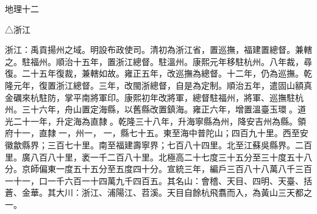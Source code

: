 
\begin{pinyinscope}
地理十二

△浙江

浙江：禹貢揚州之域。明設布政使司。清初為浙江省，置巡撫，福建置總督。兼轄之。駐福州。順治十五年，置浙江總督。駐溫州。康熙元年移駐杭州。八年裁，尋復。二十五年復裁，兼轄如故。雍正五年，改巡撫為總督。十二年，仍為巡撫。乾隆元年，復置浙江總督。三年，改閩浙總督，自是為定制。順治五年，遣固山額真金礪來杭駐防，掌平南將軍印。康熙初年改將軍，總督駐福州，將軍、巡撫駐杭州。三十六年，舟山置定海縣，以舊縣改置鎮海。雍正六年，增置溫臺玉環。道光二十一年，升定海為直隸。乾隆三十八年，升海寧縣為州，降安吉州為縣。領府十一，直隸一，州一，一，縣七十五。東至海中普陀山；四百九十里。西至安徽歙縣界；三百七十里。南至福建壽寧界；七百八十四里。北至江蘇吳縣界。二百里。廣八百八十里，袤一千二百八十里。北極高二十七度三十五分至三十度五十八分。京師偏東一度五十五分至五度四十分。宣統三年，編戶三百八十八萬八千三百一十一，口一千六百一十四萬九千四百五。其名山：會稽、天目、四明、天臺、括蒼、金華。其大川：浙江、浦陽江、苕溪。天目自餘杭飛翥而入，為黃山三天都之一。


\end{pinyinscope}

